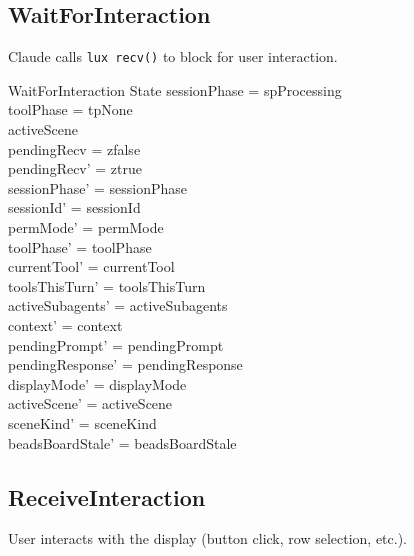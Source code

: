 \documentclass[a4paper,10pt,fleqn]{article}
\begin{document}
\subsection{WaitForInteraction}

Claude calls \texttt{lux recv()} to block for user interaction.

\begin{schema}{WaitForInteraction}
  \Delta State
  \where
  sessionPhase = spProcessing \\
  toolPhase = tpNone \\
  activeScene \neq \emptyset \\
  pendingRecv = zfalse \\
  pendingRecv' = ztrue \\
  sessionPhase' = sessionPhase \\
  sessionId' = sessionId \\
  permMode' = permMode \\
  toolPhase' = toolPhase \\
  currentTool' = currentTool \\
  toolsThisTurn' = toolsThisTurn \\
  activeSubagents' = activeSubagents \\
  context' = context \\
  pendingPrompt' = pendingPrompt \\
  pendingResponse' = pendingResponse \\
  displayMode' = displayMode \\
  activeScene' = activeScene \\
  sceneKind' = sceneKind \\
  beadsBoardStale' = beadsBoardStale
\end{schema}

\subsection{ReceiveInteraction}

User interacts with the display (button click, row selection, etc.).
\end{document}

